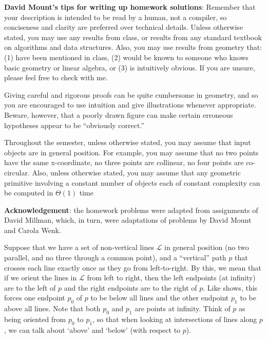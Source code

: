 \documentclass{article}
\begin{document}
{\bf David Mount's tips for writing up homework solutions}:
Remember that your description is intended to be read by a
human, not a compiler, so conciseness and clarity are preferred over technical
details.  Unless otherwise stated, you may use any results from class, or
results from any standard textbook on algorithms and data structures. Also, you
may use results from geometry that: (1) have been mentioned in class, (2) would
be known to someone who knows basic geometry or linear algebra, or (3) is
intuitively obvious. If you are unsure, please feel free to check with me.

Giving careful and rigorous proofs can be quite cumbersome in geometry, and so
you are encouraged to use intuition and give illustrations whenever appropriate.
Beware, however, that a poorly drawn figure can make certain erroneous
hypotheses appear to be ``obviously correct.''

Throughout the semester, unless otherwise stated, you may assume that input
objects are in general position. For example, you may assume that no two points
have the same x-coordinate, no three points are collinear, no four points are
co-circular. Also, unless otherwise stated, you may assume that any geometric
primitive involving a constant number of objects each of constant complexity can
be computed in $\Theta(1)$ time


{\bf Acknowledgement}: the homework problems were adapted from assignments of David
Millman, which, in turn, were adaptations of problems by David Mount and Carola
Wenk.

\collab{\todo{}}

Suppose that we have a set of non-vertical lines $\mathcal{L}$ in general position (no two
parallel, and no three through a common point), and a ``vertical'' path $p$ that crosses each
line exactly once as they go from left-to-right. By this, we mean
that if we orient the lines in $\mathcal{L}$ from left to right, then the left
endpoints (at infinity) are to the left of $p$ and the right endpoints are to
the right of $p$.  Like  shows, this forces one endpoint
$p_0$ of
$p$ to be below all lines and the other endpoint $p_1$ to be above all lines.
Note that both $p_0$ and $p_1$ are points at infinity.  Think of $p$ as being
oriented from $p_0$ to $p_1$, so that when looking at intersections of lines
along $p$, we can talk about `above' and `below' (with respect to $p$).
\end{document}
